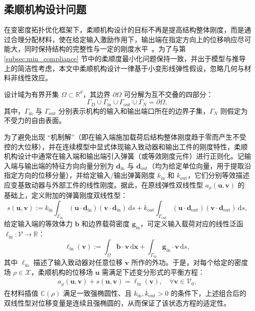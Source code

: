 \subsection{柔顺机构设计问题}
\label{subsec:compliant_mechanisms}

在变密度拓扑优化框架下，柔顺机构设计的目标不再是提高结构整体刚度，而是通过合理分配材料，使在给定输入激励作用下，输出端在指定方向上的位移响应尽可能大，同时保持结构的完整性与一定的刚度水平~\cite{bendsoeTopologyOptimization2004a}。为了与第 \ref{subsec:min_compliance} 节中的柔顺度最小化问题保持一致，并出于模型与推导上的简洁性考虑，本文中柔顺机构设计一律基于小变形线弹性假设，忽略几何与材料非线性效应。

设计域为有界开集 $\Omega\subset\mathbb{R}^d$，其边界 $\partial\Omega$ 可分解为互不交叠的四部分：
\[
\Gamma_D \cup \Gamma_{\mathrm{in}} \cup \Gamma_{\mathrm{out}} \cup \Gamma_N = \partial\Omega,
\]
其中，$\Gamma_{\mathrm{in}}$ 与 $\Gamma_{\mathrm{out}}$ 分别表示机构的输入和输出端口所在的边界子集，$\Gamma_N$ 则假定为不受力的自由表面。

为了避免出现 “机制解”（即在输入端施加载荷后结构整体刚度趋于零而产生不受控的大位移），并在连续模型中显式体现输入致动器和输出工件的刚度特性，柔顺机构设计中通常在输入端和输出端引入弹簧（或等效刚度元件）进行正则化。记输入端与输出端的特征方向向量分别为 $\boldsymbol{d}_{\mathrm{in}}$ 与 $\boldsymbol{d}_{\mathrm{out}}$（均为给定单位向量，用于提取沿指定方向的位移分量），并给定输入/输出弹簧刚度 $k_{\mathrm{in}}$ 和 $k_{\mathrm{out}}$，它们分别等效描述应变基致动器与外部工件的线性刚度。据此，在原线弹性双线性型 $a_\rho(\boldsymbol{u},\boldsymbol{v})$ 的基础上，定义附加的弹簧刚度双线性型：
\[
s(\boldsymbol{u},\boldsymbol{v}) := k_{\mathrm{in}}\int_{\Gamma_{\mathrm{in}}}(\boldsymbol{u}\cdot\boldsymbol{d}_{\mathrm{in}})(\boldsymbol{v}\cdot\boldsymbol{d}_{\mathrm{in}})\,\mathrm{d}s + k_{\mathrm{out}}\int_{\Gamma_{\mathrm{out}}}(\boldsymbol{u}\cdot\boldsymbol{d}_{\mathrm{out}})(\boldsymbol{v}\cdot\boldsymbol{d}_{\mathrm{out}})\,\mathrm{d}s,
\]
给定输入端的等效体力 $\boldsymbol{b}$ 和边界载荷密度 $\boldsymbol{g}_{\mathrm{in}}$，可定义输入载荷对应的线性泛函 $\ell_{\mathrm{in}}:\mathcal{V}\to\mathbb{R}$：
\[
\ell_{\mathrm{in}}(\boldsymbol{v}) := \int_{\Omega}\boldsymbol{b}\cdot\boldsymbol{v}\,\mathrm{d}\boldsymbol{x} + \int_{\Gamma_{\mathrm{in}}}\boldsymbol{g}_{\mathrm{in}}\cdot\boldsymbol{v}\,\mathrm{d}s,
\]
其中 $\ell_{\mathrm{in}}$ 描述了输入致动器对任意位移 $\boldsymbol{v}$ 所作的外功。于是，对每个给定的密度场 $\rho\in\mathcal{X}$，柔顺机构的位移场 $\boldsymbol{u}$ 需满足下述变分形式的平衡方程：
\[
\begin{aligned}
	a_\rho(\boldsymbol{u},\boldsymbol{v}) + s(\boldsymbol{u},\boldsymbol{v}) = \ell_{\mathrm{in}}(\boldsymbol{v}),\quad \forall \boldsymbol{v}\in\mathcal{V}_0, 
\end{aligned}
\]
在材料插值 $\mathbb{C}(\rho)$ 满足一致强椭圆性、且 $k_{\mathrm{in}},k_{\mathrm{out}}>0$ 的条件下，上述组合后的双线性型对位移变量是连续且强椭圆的，从而保证了该状态方程的适定性。

